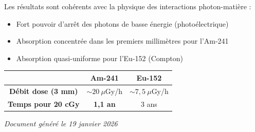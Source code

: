 \documentclass[11pt,a4paper]{article}
\begin{document}
\vspace{0.5cm}

\begin{keypoint}
Les résultats sont cohérents avec la physique des interactions photon-matière :
\begin{itemize}
    \item Fort pouvoir d'arrêt des photons de basse énergie (photoélectrique)
    \item Absorption concentrée dans les premiers millimètres pour l'Am-241
    \item Absorption quasi-uniforme pour l'Eu-152 (Compton)
\end{itemize}
\end{keypoint}

\vspace{1cm}

\begin{center}
\begin{tabular}{|c|c|c|}
\hline
\rowcolor{headerblue!30}
& \textbf{Am-241} & \textbf{Eu-152} \\
\hline
\textbf{Débit dose (3 mm)} & $\sim 20~\mu$Gy/h & $\sim 7{,}5~\mu$Gy/h \\
\hline
\textbf{Temps pour 20 cGy} & \cellcolor{successgreen!30}\textbf{1,1 an} & 3 ans \\
\hline
\end{tabular}
\end{center}

\vspace{0.5cm}

\begin{flushright}
\textit{Document généré le 19 janvier 2026}
\end{flushright}
\end{document}
